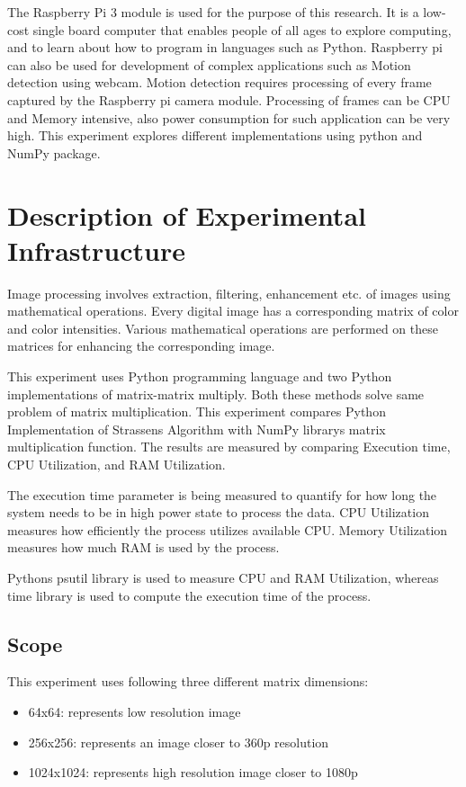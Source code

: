 \documentclass[conference]{IEEEtran}
\begin{document}
    The Raspberry Pi 3 module is used for the purpose of this research. It is a low-cost single board computer that enables people 
    of all ages to explore computing, and to learn about how to program in languages such as Python. Raspberry pi can also be used 
    for development of complex applications such as Motion detection using webcam. Motion detection requires processing of every 
    frame captured by the Raspberry pi camera module. Processing of frames can be CPU and Memory intensive, also power consumption 
    for such application can be very high. This experiment explores different implementations using python and NumPy package. 

\section{Description of Experimental Infrastructure}
    Image processing involves extraction, filtering, enhancement etc. of images using mathematical operations. Every digital image has 
    a corresponding matrix of color and color intensities. Various mathematical operations are performed on these matrices for enhancing 
    the corresponding image.

    This experiment uses Python programming language and two Python implementations of matrix-matrix multiply. Both these methods solve 
    same problem of matrix multiplication. This experiment compares Python Implementation of Strassen\textquotesingle s Algorithm with NumPy 
    library\textquotesingle s matrix multiplication function. The results are measured by comparing Execution time, CPU Utilization, 
    and RAM Utilization. 

    The execution time parameter is being measured to quantify for how long the system needs to be in high power state to process 
    the data. CPU Utilization measures how efficiently the process utilizes available CPU. Memory Utilization measures how much RAM 
    is used by the process.
    
    Python\textquotesingle s psutil library is used to measure CPU and RAM Utilization, whereas time library is used to compute the execution 
    time of the process.


\subsection{Scope}
    This experiment uses following three different matrix dimensions:
    \begin{itemize}
        \item 64x64: represents low resolution image
        \item 256x256: represents an image closer to 360p resolution
        \item 1024x1024: represents high resolution image closer to 1080p
    \end{itemize}
\end{document}
